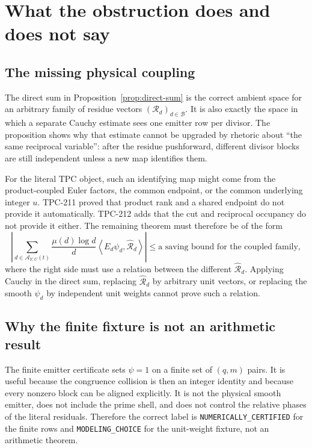 \documentclass[11pt]{article}
\theoremstyle{definition}
\theoremstyle{remark}
\newcommand{\Aset}{\mathcal A}
\newcommand{\muM}{\mu}
\newcommand{\ip}[2]{\left\langle #1,#2\right\rangle}
\begin{document}
\section{What the obstruction does and does not say}

\subsection{The missing physical coupling}

The direct sum in Proposition~\ref{prop:direct-sum} is the correct ambient
space for an arbitrary family of residue vectors $(\mathcal R_d)_{d\in\mathcal
B}$.  It is also exactly the space in which a separate Cauchy estimate sees
one emitter row per divisor.  The proposition shows why that estimate cannot
be upgraded by rhetoric about ``the same reciprocal variable'': after the
residue pushforward, different divisor blocks are still independent unless a
new map identifies them.

For the literal TPC object, such an identifying map might come from the
product-coupled Euler factors, the common endpoint, or the common underlying
integer $u$.  TPC-211 proved that product rank and a shared endpoint do not
provide it automatically.  TPC-212 adds that the cut and reciprocal occupancy
do not provide it either.  The remaining theorem must therefore be of the
form
\begin{equation}
 \left|\sum_{d\in\Aset_{Y,U}(t)}
 \frac{\muM(d)\log d}{d}
 \ip{E_d\psi_d}{\widehat{\mathcal R}_d}\right|
 \leq \text{a saving bound for the coupled family},
 \label{eq:needed-physical-theorem}
\end{equation}
where the right side must use a relation between the different
$\widehat{\mathcal R}_d$.  Applying Cauchy in the direct sum, replacing
$\widehat{\mathcal R}_d$ by arbitrary unit vectors, or replacing the smooth
$\psi_d$ by independent unit weights cannot prove such a relation.

\subsection{Why the finite fixture is not an arithmetic result}

The finite emitter certificate sets $\psi=1$ on a finite set of $(q,m)$ pairs.
It is useful because the congruence collision is then an integer identity and
because every nonzero block can be aligned explicitly.  It is not the physical
smooth emitter, does not include the prime shell, and does not control the
relative phases of the literal residuals.  Therefore the correct label is
\texttt{NUMERICALLY\_CERTIFIED} for the finite rows and
\texttt{MODELING\_CHOICE} for the unit-weight fixture, not an arithmetic
theorem.
\end{document}

